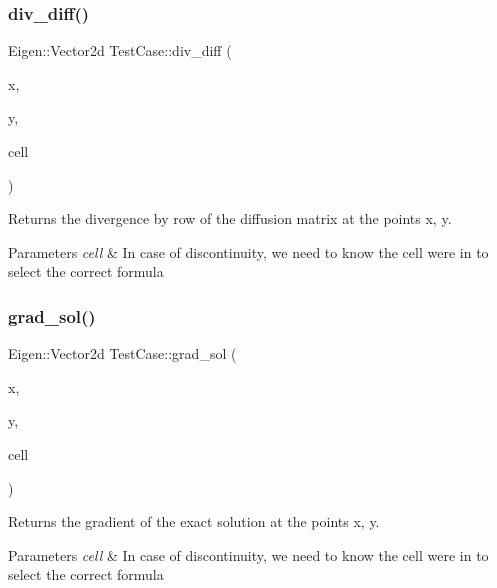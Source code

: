 \subsubsection{\texorpdfstring{div\+\_\+diff()}{div\_diff()}}
{\footnotesize\ttfamily Eigen\+::\+Vector2d Test\+Case\+::div\+\_\+diff (\begin{DoxyParamCaption}\item[{const double}]{x,  }\item[{const double}]{y,  }\item[{const \hyperlink{classHArDCore2D_1_1Cell}{Cell} $\ast$}]{cell }\end{DoxyParamCaption})}



Returns the divergence by row of the diffusion matrix at the points x, y. 


\begin{DoxyParams}{Parameters}
{\em cell} & In case of discontinuity, we need to know the cell we\textquotesingle{}re in to select the correct formula \\
\hline
\end{DoxyParams}
\mbox{\label{classTestCase_a2e3004705b74b232dc54d84652ec88ae}} 
\subsubsection{\texorpdfstring{grad\+\_\+sol()}{grad\_sol()}}
{\footnotesize\ttfamily Eigen\+::\+Vector2d Test\+Case\+::grad\+\_\+sol (\begin{DoxyParamCaption}\item[{const double}]{x,  }\item[{const double}]{y,  }\item[{const \hyperlink{classHArDCore2D_1_1Cell}{Cell} $\ast$}]{cell }\end{DoxyParamCaption})}



Returns the gradient of the exact solution at the points x, y. 


\begin{DoxyParams}{Parameters}
{\em cell} & In case of discontinuity, we need to know the cell we\textquotesingle{}re in to select the correct formula \\
\hline
\end{DoxyParams}
\mbox{\label{classTestCase_aadf1375364b34ad3b9fa651eae5baa1e}} 
